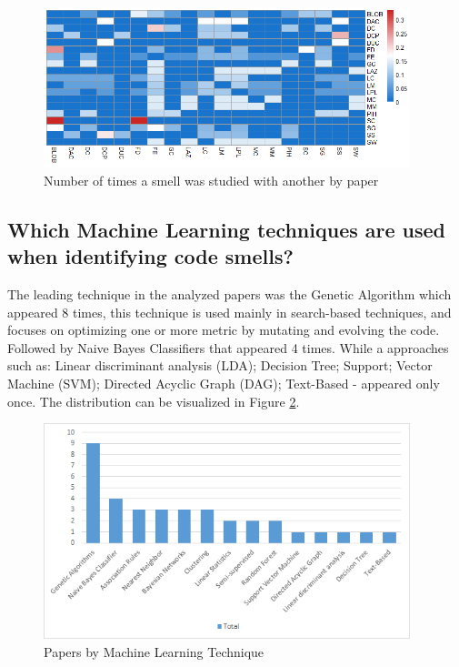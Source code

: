 \begin{figure}[!ht] 
    \centering
	\caption{Number of times a smell was studied with another by paper}
	\label{fig:smellsCoOccurrence}
	\includegraphics[width=0.95\textwidth]{imagens/smellsCoOcurrenceHM.png}
\end{figure}

\subsection{Which Machine Learning techniques are used when identifying code smells?}

The leading technique in the analyzed papers was the Genetic Algorithm which appeared 8 times, this technique is used mainly in search-based techniques, and focuses on optimizing one or more metric by mutating and evolving the code. Followed by Naive Bayes Classifiers that appeared 4 times. While a approaches such as: Linear discriminant analysis (LDA); Decision Tree; Support; Vector Machine (SVM); Directed Acyclic Graph (DAG); Text-Based - appeared only once. The distribution can be visualized in Figure \ref{fig:papersByMLTechnique}.

\begin{figure}[!ht] 
    \centering
	\caption{Papers by Machine Learning Technique}
	\label{fig:papersByMLTechnique}
	\includegraphics[width=0.95\textwidth]{imagens/papersByMLTechnique.png}
\end{figure}

